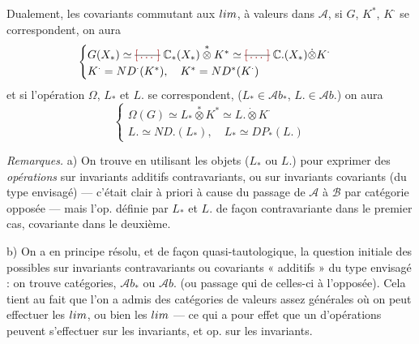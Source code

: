 \documentclass[11pt,a4paper]{article}
\begin{document}
Dualement,  les \struck{\ill{}}  
covariants commutant aux $\varinjlim$, à valeurs dans $\mathcal{A}$, si $G$, $K^{*}$,
$K^{\cdot}$ se correspondent, on aura
\[
  \begin{cases}
    G(X_{*}) \simeq \text{\struck{\ill{}}}\;\mathbb{C}_{*}(X_{*}) \overset{*}{\otimes} K^{*} \simeq \text{\struck{\ill{}}}\;\mathbb{C}.(X_{*}) \dot{\otimes} K^{\cdot} \\
    K^{\cdot} = ND^{\cdot}(K^{*}), \quad K^{*} = ND^{*}(K^{\cdot})
  \end{cases}
\]
et si l'opération $\Omega$, $L_{*}$ et $L.$ se correspondent, ($L_{*} \in \mathcal{A}b_{*}$,
$L. \in \mathcal{A}b.$) on aura
\[
  \begin{cases}
    \Omega(G) \simeq L_{*} \overset{*}{\otimes} K^{*} \simeq L. \dot{\otimes} K^{\cdot} \\
    L. \simeq ND.(L_{*}), \quad L_{*} \simeq DP_{*}(L.)
  \end{cases}
\]

\emph{Remarques.} a) On trouve en utilisant les  objets ($L_{*}$ ou
$L.$) pour exprimer des \emph{opérations} sur invariants additifs contravariants, ou sur
invariants  covariants (du type envisagé) --- c'était clair à priori
à cause du passage de $\mathcal{A}$ à $\mathcal{B}$ par  catégorie
opposée --- mais l'op. définie par $L_{*}$ \struck{\ill{}} et $L.$ de façon
contravariante dans le premier cas, covariante dans le deuxième.

b) On a en principe résolu, et de façon quasi-tautologique, la question initiale
des \struck{\ill{} \ill{}}  possibles sur
invariants contravariants ou covariants « additifs » du type envisagé : on trouve
\struck{\ill{}} \emph{} catégories, $\mathcal{A}b_{*}$ ou
$\mathcal{A}b.$ (ou \struck{\ill{}} passage qui de celles-ci à l'opposée). Cela
tient au fait que l'on a admis des catégories de valeurs 
 assez générales \struck{\ill{}} où on
peut effectuer \struck{\ill{}} les $\varprojlim$, ou bien les $\varinjlim$ --- ce
qui a pour effet que un  d'opérations peuvent s'effectuer sur les
\struck{\ill{}}  invariants, et op. sur les invariants.
\end{document}
